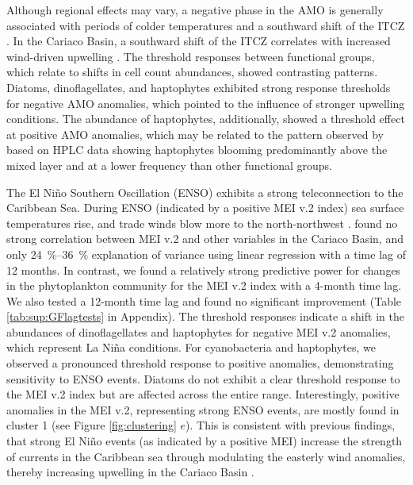 \documentclass[draft]{agujournal2019}
\begin{document}
    Although regional effects may vary, a negative phase in the AMO is generally associated with periods of colder temperatures and a southward shift of the ITCZ \cite{knight_climate_2006, colna2017latitudinal}. In the Cariaco Basin, a southward shift of the ITCZ correlates with increased wind-driven upwelling \cite{taylor_ecosystem_2012}. The threshold responses between functional groups, which relate to shifts in cell count abundances, showed contrasting patterns. Diatoms, dinoflagellates, and haptophytes exhibited strong response thresholds for negative AMO anomalies, which pointed to the influence of stronger upwelling conditions. The abundance of haptophytes, additionally, showed a threshold effect at positive AMO anomalies, which may be related to the pattern observed by \citeauthor{pinckney_phytoplankton_2015} based on HPLC data showing haptophytes blooming predominantly above the mixed layer and at a lower frequency than other functional groups. 
    
    The El Niño Southern Oscillation (ENSO) exhibits a strong teleconnection to the Caribbean Sea. During ENSO (indicated by a positive MEI v.2 index) sea surface temperatures rise, and trade winds blow more to the north-northwest \cite{enfield_tropical_1997}.  found no strong correlation between MEI v.2 and other variables in the Cariaco Basin, and only \qtyrange{24}{36}{\%} explanation of variance using linear regression with a time lag of 12 months. In contrast, we found a relatively strong predictive power for changes in the phytoplankton community for the MEI v.2 index with a 4-month time lag. We also tested a 12-month time lag and found no significant improvement (Table \ref{tab:sup:GFlagtests} in Appendix).
    The threshold responses indicate a shift in the abundances of dinoflagellates and haptophytes for negative MEI v.2 anomalies, which represent La Niña conditions. For cyanobacteria and haptophytes, we observed a pronounced threshold response to positive anomalies, demonstrating sensitivity to ENSO events. Diatoms do not exhibit a clear threshold response to the MEI v.2 index but are affected across the entire range. Interestingly, positive anomalies in the MEI v.2, representing strong ENSO events, are mostly found in cluster 1 (see Figure \ref{fig:clustering} $e$). This is consistent with previous findings, that strong El Niño events (as indicated by a positive MEI) increase the strength of currents in the Caribbean sea through modulating the easterly wind anomalies, thereby increasing upwelling in the Cariaco Basin \cite{huang_enso_2023}.
    
\end{document}

